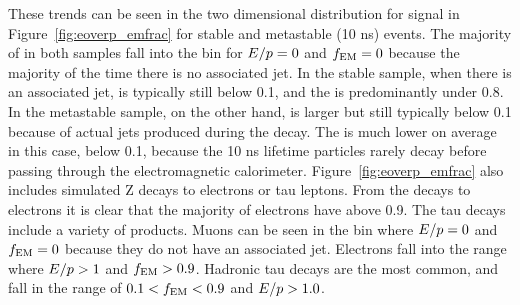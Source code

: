 These trends can be seen in the two dimensional distribution for signal in Figure~\ref{fig:eoverp_emfrac} for stable and metastable (10 ns) events.
The majority of \rhadrons in both samples fall into the bin for $E/p = 0$ and $f_\mathrm{EM} = 0$ because the majority of the time there is no associated jet. 
In the stable sample, when there is an associated jet, \ep is typically still below 0.1, and the \emfrac is predominantly under 0.8.
In the metastable sample, on the other hand, \ep is larger but still typically below 0.1 because of actual jets produced during the decay.
The \emfrac is much lower on average in this case, below 0.1, because the 10 ns lifetime particles rarely decay before passing through the electromagnetic calorimeter.
Figure~\ref{fig:eoverp_emfrac} also includes simulated Z decays to electrons or tau leptons.
From the decays to electrons it is clear that the majority of electrons have \emfrac above 0.9.
The tau decays include a variety of products.
Muons can be seen in the bin where $E/p = 0$ and $f_\mathrm{EM} = 0$ because they do not have an associated jet.
Electrons fall into the range where $E/p > 1$ and $f_\mathrm{EM} > 0.9$.
Hadronic tau decays are the most common, and fall in the range of $0.1 < f_\mathrm{EM} < 0.9$ and $E/p > 1.0$. 

